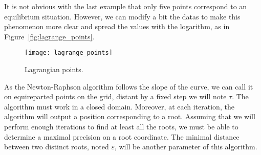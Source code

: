 It is not obvious with the last example that only five points correspond to an equilibrium situation. However, we can modify a bit the datas to make this phenomenon more clear and spread the values with the logarithm, as in Figure~\vref{fig:lagrange_points}.

\begin{figure}[ht]
  \centering
  \texttt{[image: lagrange\_points]} 
  \caption[Lagrange points]{Lagrangian points.}
  \label{fig:lagrange_points}
\end{figure}

As the Newton-Raphson algorithm follows the slope of the curve, we can call it on equireparted points on the grid, distant by a fixed step we will note $\tau$. The algorithm must work in a closed domain. Moreover, at each iteration, the algorithm will output a position corresponding to a root. Assuming that we will perform enough iterations to find at least all the roots, we must be able to determine a maximal precision on a root coordinate. The minimal distance between two distinct roots, noted $\varepsilon$, will be another parameter of this algorithm.